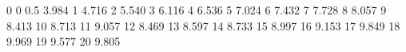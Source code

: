 0 0
0.5 3.984
1 4.716
2 5.540
3 6.116
4 6.536
5 7.024
6 7.432
7 7.728
8 8.057
9 8.413
10 8.713
11 9.057
12 8.469
13 8.597
14 8.733
15 8.997
16 9.153
17 9.849
18 9.969
19 9.577
20 9.805

